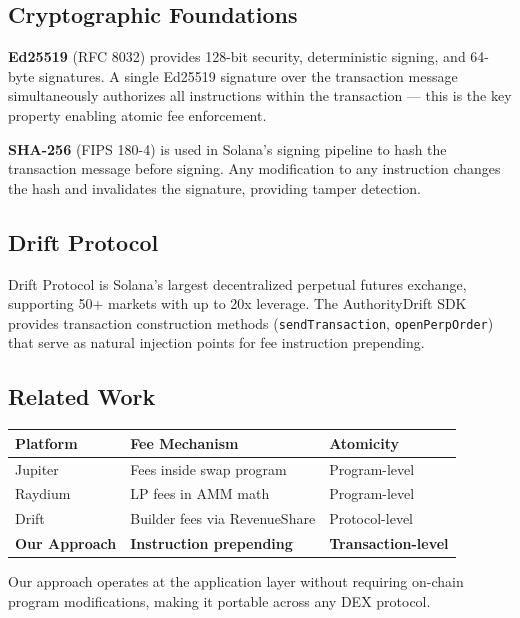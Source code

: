 \documentclass[12pt,a4paper]{article}
\begin{document}
\subsection{Cryptographic Foundations}

\textbf{Ed25519} (RFC 8032) provides 128-bit security, deterministic signing, and 64-byte signatures. A single Ed25519 signature over the transaction message simultaneously authorizes all instructions within the transaction --- this is the key property enabling atomic fee enforcement.

\textbf{SHA-256} (FIPS 180-4) is used in Solana's signing pipeline to hash the transaction message before signing. Any modification to any instruction changes the hash and invalidates the signature, providing tamper detection.

\subsection{Drift Protocol}

Drift Protocol is Solana's largest decentralized perpetual futures exchange, supporting 50+ markets with up to 20x leverage. The AuthorityDrift SDK provides transaction construction methods (\texttt{sendTransaction}, \texttt{openPerpOrder}) that serve as natural injection points for fee instruction prepending.

\subsection{Related Work}

\begin{center}
\begin{tabular}{l l l}
\toprule
\textbf{Platform} & \textbf{Fee Mechanism} & \textbf{Atomicity} \\
\midrule
Jupiter & Fees inside swap program & Program-level \\
Raydium & LP fees in AMM math & Program-level \\
Drift & Builder fees via RevenueShare & Protocol-level \\
\textbf{Our Approach} & \textbf{Instruction prepending} & \textbf{Transaction-level} \\
\bottomrule
\end{tabular}
\end{center}

Our approach operates at the application layer without requiring on-chain program modifications, making it portable across any DEX protocol.
\end{document}
